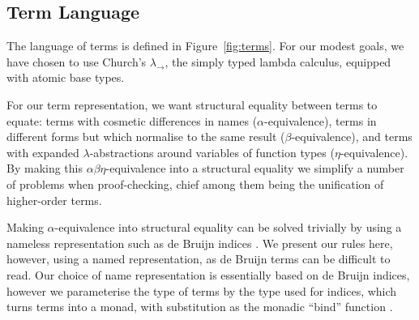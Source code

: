 \documentclass[a4paper]{jfp}
\begin{document}
\subsection{Term Language}

The language of terms is defined in Figure~\ref{fig:terms}. For our modest goals, we have chosen to use
Church's $\lambda_\rightarrow$, the simply typed lambda calculus, equipped with atomic base types.

For our term representation, we want structural equality between terms to equate: terms with cosmetic differences in names ($\alpha$-equivalence), terms in different forms but which normalise
to the same result ($\beta$-equivalence), and terms with expanded $\lambda$-abstractions around variables
of function types ($\eta$-equivalence). By making this $\alpha\beta\eta$-equivalence into a structural equality
we simplify a number of problems when proof-checking, chief among them being the unification of higher-order terms.

Making $\alpha$-equivalence into structural equality can be solved trivially by
using a nameless representation such as de Bruijn indices
\cite{deBruijn:1972tm}. We present our rules here, however, using a named
representation, as de Bruijn terms can be difficult to read. Our choice of name representation is
essentially based on de Bruijn indices, however we parameterise the type of terms by the type used
for indices, which turns terms into a monad, with substitution as the monadic ``bind'' function \cite{Bird:1999:DBN:968699.968702}.
\end{document}

